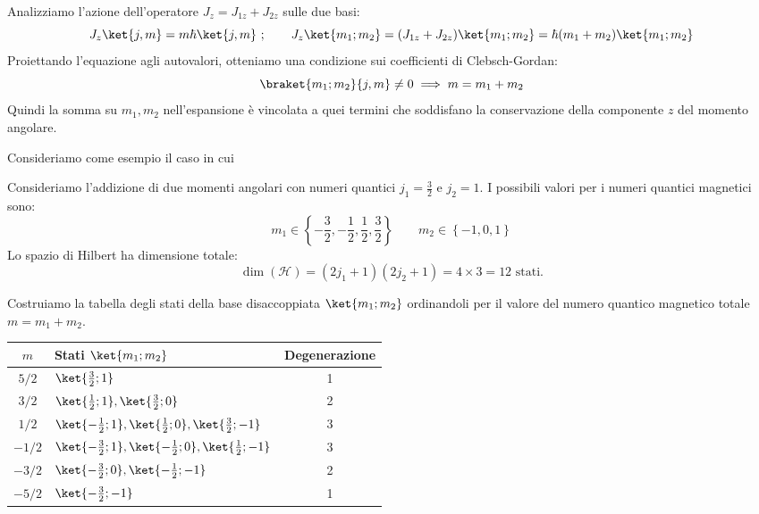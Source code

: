 Analizziamo l'azione dell'operatore $J_z = J_{1z} + J_{2z}$ sulle due basi:
\[
    J_z \ket{j, m} = m\hbar \ket{j, m} \ ;
    \qquad
    J_z \ket{m_1; m_2} = (J_{1z} + J_{2z})\ket{m_1; m_2} = \hbar(m_1 + m_2)\ket{m_1; m_2}
\]
Proiettando l'equazione agli autovalori, otteniamo una condizione sui coefficienti di Clebsch-Gordan:
\[
    \braket{m_1; m_2}{j, m} \neq 0 \implies m = m_1 + m_2
\]
Quindi la somma su $m_1, m_2$ nell'espansione è vincolata a quei termini che soddisfano la conservazione della componente $z$ del momento angolare.

\begin{example}
    Consideriamo come esempio il caso in cui \(\)
\end{example}



Consideriamo l'addizione di due momenti angolari con numeri quantici $j_1 = \frac{3}{2}$ e $j_2 = 1$.
I possibili valori per i numeri quantici magnetici sono:
\[
    m_1 \in \left\{ -\frac{3}{2}, -\frac{1}{2}, \frac{1}{2}, \frac{3}{2} \right\} \qquad 
    m_2 \in \left\{ -1, 0, 1 \right\}
\]
Lo spazio di Hilbert ha dimensione totale:
\[
    \dim(\mathcal{H}) = (2j_1+1)(2j_2+1) = 4 \times 3 = 12 \text{ stati}.
\]

Costruiamo la tabella degli stati della base disaccoppiata $\ket{m_1; m_2}$ ordinandoli per il valore del numero quantico magnetico totale $m = m_1 + m_2$.

\begin{center}
\begin{tabular}{c | l | c}
    $m$ & Stati $\ket{m_1; m_2}$ & Degenerazione \\
    \hline
    $5/2$ & $\ket{\frac{3}{2}; 1}$ & 1 \\
    $3/2$ & $\ket{\frac{1}{2}; 1}, \ket{\frac{3}{2}; 0}$ & 2 \\
    $1/2$ & $\ket{-\frac{1}{2}; 1}, \ket{\frac{1}{2}; 0}, \ket{\frac{3}{2}; -1}$ & 3 \\
    $-1/2$ & $\ket{-\frac{3}{2}; 1}, \ket{-\frac{1}{2}; 0}, \ket{\frac{1}{2}; -1}$ & 3 \\
    $-3/2$ & $\ket{-\frac{3}{2}; 0}, \ket{-\frac{1}{2}; -1}$ & 2 \\
    $-5/2$ & $\ket{-\frac{3}{2}; -1}$ & 1 \\
\end{tabular}
\end{center}

